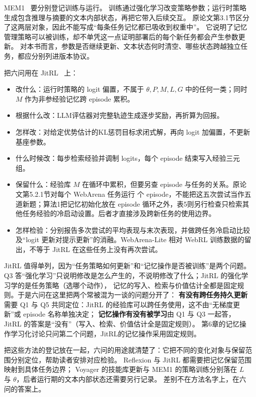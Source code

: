 MEM1~\cite{mem1-2506} 要分别登记训练与运行。
训练通过强化学习改变策略参数；运行时策略生成包含推理与摘要的文本内部状态，再把它带入后续交互。
原论文第3.1节区分了这两层对象，因此不能写成``每条任务记忆都已吸收到权重中''。
它说明了记忆管理策略可以被训练，却不单凭这一点证明部署后的每个新任务都会产生参数更新。
对本书而言，参数是否继续更新、文本状态何时清空、哪些状态跨越独立任务，都应分别列进版本协议。

把六问用在 JitRL~\cite{jitrl-2601} 上：

\begin{itemize}
  \item 改什么：运行时策略的 logit 偏置，不属于 $\theta,P,M,L,G$ 中的任何一类；同时 $M$ 作为非参经验记忆跨 episode 累积。
  \item 根据什么改：LLM评估器对完整轨迹生成逐步奖励，再折算为回报。
  \item 怎样改：对给定优势估计的KL惩罚目标求闭式解，再向 logit 加偏置，不更新基座参数。
  \item 什么时候改：每步检索经验并调制 logits，每个 episode 结束写入经验三元组。
  \item 保留什么：经验库 $M$ 在循环中累积，但要另查 episode 与任务的关系。原论文第5.2.1节对每个 WebArena 任务运行  个 episode，不能把这五次尝试当作五道新题；算法1把记忆初始化放在 episode 循环之外，表5则另行检查只检索其他任务经验的冷启动设置。后者才直接涉及跨新任务的使用边界。
  \item 怎样检验：分别报告多次尝试的平均表现与末次表现，并做跨任务冷启动比较及“logit 更新对提示更新”的消融。WebArena-Lite 相对 WebRL 训练数据的留出，不等于 JitRL 在这些任务上没有再次尝试。
\end{itemize}

JitRL 值得单列，因为“任务策略如何更新”和“记忆操作是否被训练”是两个问题。
Q3 答“强化学习”只说明修改是怎么产生的，不说明修改了什么；JitRL 的强化学习学的是任务策略（选哪个动作），
记忆的写入、检索与价值估计全都是固定规则。于是六问在这里把两个常被混为一谈的问题分开了：
\textbf{有没有跨任务持久更新}需要 Q1 与 Q5 共同定位：JitRL 的经验库可以跨任务使用，这不由“无梯度更新”或 episode 名称单独决定；
\textbf{记忆操作有没有被学习}由 Q1 与 Q3 一起答，JitRL 的答案是“没有”（写入、检索、价值估计全是固定规则）。
第6章的记忆操作学习化讨论只问第二个问题，JitRL的记忆操作采用固定规则。

把这些方法的登记放在一起，六问的用途就清楚了：它把不同的变化对象与保留范围分别定位，帮助读者安排对应检验。
Reflexion 与 JitRL 都需要把记忆保留范围映射到具体任务边界；
Voyager 的技能库更新与 MEM1 的策略训练分别落在 $L$ 与 $\theta$，后者运行期的文本内部状态还需要另行记录。
差别不在方法名字上，在六问的答案上。

